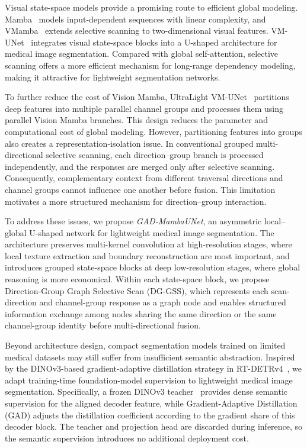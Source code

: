 Visual state-space models provide a promising route to efficient global modeling. Mamba~\cite{gu2023mamba} models input-dependent sequences with linear complexity, and VMamba~\cite{liu2024vmamba} extends selective scanning to two-dimensional visual features. VM-UNet~\cite{ruan2024vmunet} integrates visual state-space blocks into a U-shaped architecture for medical image segmentation. Compared with global self-attention, selective scanning offers a more efficient mechanism for long-range dependency modeling, making it attractive for lightweight segmentation networks.

To further reduce the cost of Vision Mamba, UltraLight VM-UNet~\cite{wu2024ultralight} partitions deep features into multiple parallel channel groups and processes them using parallel Vision Mamba branches. This design reduces the parameter and computational cost of global modeling. However, partitioning features into groups also creates a representation-isolation issue. In conventional grouped multi-directional selective scanning, each direction--group branch is processed independently, and the responses are merged only after selective scanning. Consequently, complementary context from different traversal directions and channel groups cannot influence one another before fusion. This limitation motivates a more structured mechanism for direction--group interaction.

To address these issues, we propose \emph{GAD-MambaUNet}, an asymmetric local--global U-shaped network for lightweight medical image segmentation. The architecture preserves multi-kernel convolution at high-resolution stages, where local texture extraction and boundary reconstruction are most important, and introduces grouped state-space blocks at deep low-resolution stages, where global reasoning is more economical. Within each state-space block, we propose Direction-Group Graph Selective Scan (DG-GSS), which represents each scan-direction and channel-group response as a graph node and enables structured information exchange among nodes sharing the same direction or the same channel-group identity before multi-directional fusion.

Beyond architecture design, compact segmentation models trained on limited medical datasets may still suffer from insufficient semantic abstraction. Inspired by the DINOv3-based gradient-adaptive distillation strategy in RT-DETRv4~\cite{liao2025rtdetrv4}, we adapt training-time foundation-model supervision to lightweight medical image segmentation. Specifically, a frozen DINOv3 teacher~\cite{simeoni2025dinov3} provides dense semantic supervision for the aligned decoder feature, while Gradient-Adaptive Distillation (GAD) adjusts the distillation coefficient according to the gradient share of this decoder block. The teacher and projection head are discarded during inference, so the semantic supervision introduces no additional deployment cost.

